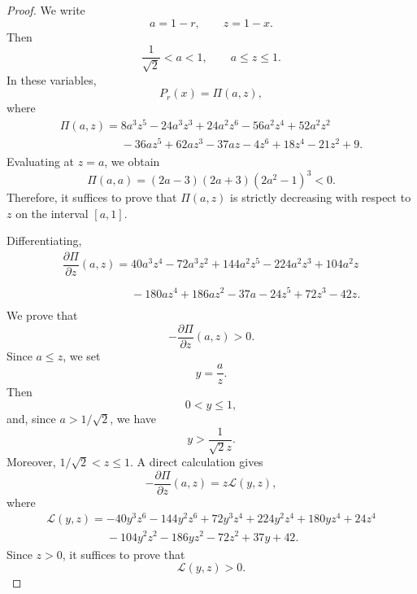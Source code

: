 \documentclass[11pt,a4paper]{article}
\numberwithin{equation}{section}
\numberwithin{table}{section}
\theoremstyle{plain}
\theoremstyle{definition}\newtheorem{definition}[theorem]{Definition}
\theoremstyle{remark}\newtheorem{remark}[theorem]{Remark}
\begin{document}
\begin{proof}
We write 
\begin{equation*}
a=1-r, \qquad z=1-x.
\end{equation*}
Then 
\begin{equation*}
\frac1{\sqrt2}<a<1, \qquad a\leq z\leq 1.
\end{equation*}
In these variables, 
\begin{equation*}
P_r(x)=\Pi(a,z),
\end{equation*}
where 
\begin{equation*}
\begin{array}{l}
\Pi(a,z)=8a^3z^5-24a^3z^3+24a^2z^6-56a^2z^4+52a^2z^2 \\ 
\phantom{\Pi(a,z)=}{}-36az^5+62az^3-37az-4z^6+18z^4-21z^2+9.%
\end{array}%
\end{equation*}
Evaluating at $z=a$, we obtain 
\begin{equation*}
\Pi(a,a)=(2a-3)(2a+3)(2a^2-1)^3<0.
\end{equation*}
Therefore, it suffices to prove that $\Pi(a,z)$ is strictly decreasing
with respect to $z$ on the interval $[a,1]$.

Differentiating, 
\begin{equation*}
\begin{array}{l}
\dfrac{\partial \Pi}{\partial z}%
(a,z)=40a^3z^4-72a^3z^2+144a^2z^5-224a^2z^3+104a^2z \\ 
\phantom{\dfrac{\partial \Pi}{\partial z}(a,z)=}{}%
-180az^4+186az^2-37a-24z^5+72z^3-42z.%
\end{array}%
\end{equation*}
We prove that 
\begin{equation*}
-\frac{\partial \Pi}{\partial z}(a,z)>0.
\end{equation*}
Since $a\leq z$, we set 
\begin{equation*}
y=\frac{a}{z}.
\end{equation*}
Then 
\begin{equation*}
0<y\leq1,
\end{equation*}
and, since $a>1/\sqrt2$, we have 
\begin{equation*}
y>\frac1{\sqrt2 z}.
\end{equation*}
Moreover, $1/\sqrt2<z\leq1$. A direct calculation gives 
\begin{equation*}
-\frac{\partial \Pi}{\partial z}(a,z)=z\mathcal{L}(y,z),
\end{equation*}
where 
\begin{equation*}
\begin{array}{l}
\mathcal{L}(y,z)=-40y^3z^6-144y^2z^6+72y^3z^4+224y^2z^4+180yz^4+24z^4 \\ 
\phantom{\mathcal L(y,z)=}{}-104y^2z^2-186yz^2-72z^2+37y+42.%
\end{array}%
\end{equation*}
Since $z>0$, it suffices to prove that 
\begin{equation*}
\mathcal{L}(y,z)>0.
\end{equation*}


\end{proof}
\end{document}
